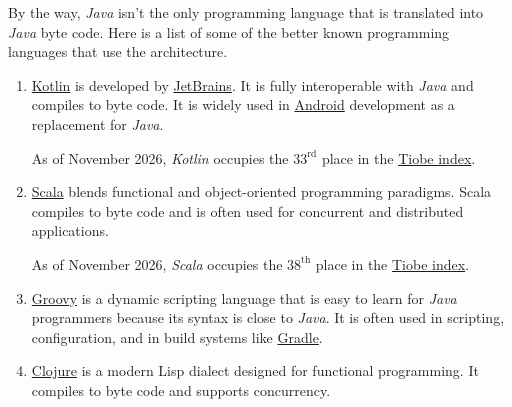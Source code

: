 By the way, \textsl{Java} isn't the only programming language that is translated into \textsl{Java} byte code.
Here is a list of some of the better known programming languages that use the  architecture.
\begin{enumerate}
\item \href{https://kotlinlang.org}{Kotlin} is  
      developed by \href{https://www.jetbrains.com/}{JetBrains}. It is fully interoperable with \textsl{Java}
      and compiles to  byte code. It is widely used in
      \href{https://en.wikipedia.org/wiki/Android_(operating_system)}{Android} development as a replacement for 
      \textsl{Java}.

      As of November 2026, \textsl{Kotlin} occupies the $33^{\mathrm{rd}}$ place in the
      \href{https://www.tiobe.com/tiobe-index/}{Tiobe index}. 
\item \href{https://www.scala-lang.org}{Scala} 
       blends functional and object-oriented programming paradigms. Scala compiles to  byte code
       and is often used for concurrent and distributed applications.

       As of November 2026, \textsl{Scala} occupies the $38^{\mathrm{th}}$ place in the
       \href{https://www.tiobe.com/tiobe-index/}{Tiobe index}.       
\item \href{https://groovy-lang.org}{Groovy} is a dynamic scripting language that is easy to learn for
      \textsl{Java} programmers because its syntax is close to \textsl{Java}. It is often used in scripting,
      configuration, and in build systems like \href{https://gradle.org}{Gradle}. 
\item \href{https://clojure.org}{Clojure}
      is a modern Lisp dialect designed for functional programming.
      It compiles to  byte code and supports concurrency.


\end{enumerate}
